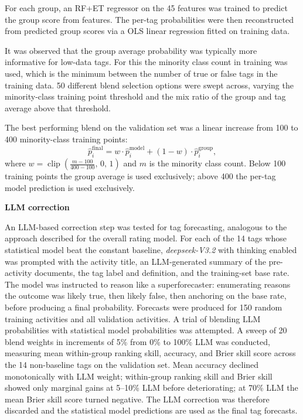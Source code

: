 For each group, an RF+ET regressor on the 45 features was trained to predict the group score from features. The per-tag probabilities were then reconstructed from predicted group scores via a OLS linear regression fitted on training data.

It was observed that the group average probability was typically more informative for low-data tags. For this the minority class count in training was used, which is the minimum between the number of true or false tags in the training data. 50 different blend selection options were swept across, varying the minority-class training point threshold and the mix ratio of the group and tag average above that threshold.

The best performing blend on the validation set was a linear increase from 100 to 400 minority-class training points:
\[
\hat{p}^{\text{final}}_i = w \cdot \hat{p}^{\text{model}}_i + (1 - w) \cdot \hat{p}^{\text{group}}_i ,
\]
where $w = \operatorname{clip}\!\left(\tfrac{m - 100}{400 - 100},\, 0,\, 1\right)$ and $m$ is the minority class count. Below 100 training points the group average is used exclusively; above 400 the per-tag model prediction is used exclusively.


\textbf{LLM correction}

An LLM-based correction step was tested for tag forecasting, analogous to the approach described for the overall rating model. For each of the 14 tags whose statistical model beat the constant baseline, \emph{deepseek-V3.2} with thinking enabled was prompted with the activity title, an LLM-generated summary of the pre-activity documents, the tag label and definition, and the training-set base rate. The model was instructed to reason like a superforecaster: enumerating reasons the outcome was likely true, then likely false, then anchoring on the base rate, before producing a final probability. Forecasts were produced for 150 random training activities and all validation activities. A trial of blending LLM probabilities with statistical model probabilities was attempted. A sweep of 20 blend weights in increments of 5\% from 0\% to 100\% LLM was conducted, measuring mean within-group ranking skill, accuracy, and Brier skill score across the 14 non-baseline tags on the validation set. Mean accuracy declined monotonically with LLM weight; within-group ranking skill and Brier skill showed only marginal gains at 5--10\% LLM before deteriorating; at 70\% LLM the mean Brier skill score turned negative. The LLM correction was therefore discarded and the statistical model predictions are used as the final tag forecasts.


